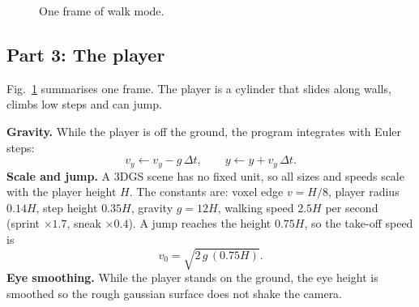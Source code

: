 \documentclass[9pt,twocolumn,a4paper]{extarticle}
\begin{document}
\begin{figure}[H]
\centering
{}
\caption{One frame of walk mode.}
\label{fig:t5}
\end{figure}

\subsection{Part 3: The player}
Fig.~\ref{fig:t5} summarises one frame. The player is a cylinder that slides along walls, climbs low steps and can jump.

\textbf{Gravity.} While the player is off the ground, the program integrates with Euler steps:
\begin{equation}
v_y \leftarrow v_y - g\,\Delta t,
\qquad
y \leftarrow y + v_y\,\Delta t.
\label{eq:euler}
\end{equation}
\textbf{Scale and jump.} A 3DGS scene has no fixed unit, so all sizes and speeds scale with the player height $H$. The constants are: voxel edge $v=H/8$, player radius $0.14H$, step height $0.35H$, gravity $g=12H$, walking speed $2.5H$ per second (sprint $\times1.7$, sneak $\times0.4$). A jump reaches the height $0.75H$, so the take-off speed is
\begin{equation}
v_0=\sqrt{2\,g\,(0.75H)}.
\label{eq:jump}
\end{equation}
\textbf{Eye smoothing.} While the player stands on the ground, the eye height is smoothed so the rough gaussian surface does not shake the camera.

\par\noindent{}\par\vspace{3pt}
\end{document}
